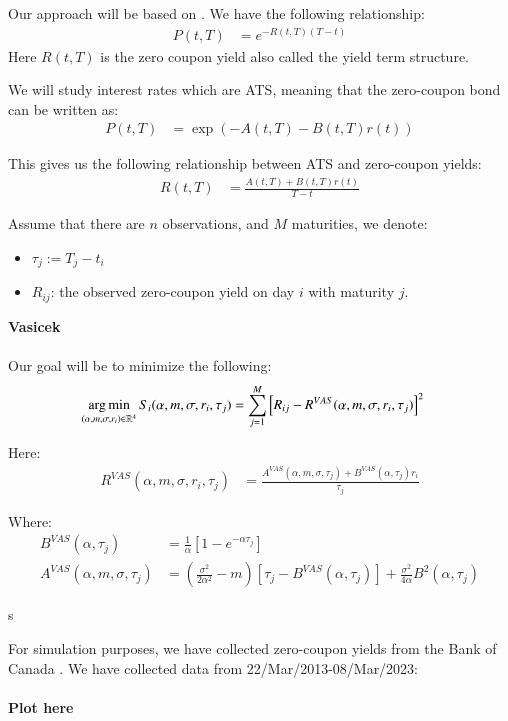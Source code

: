 \newpage 
Our approach will be based on \cite{halga2014}. We have the following relationship: 
\begin{align*}
P(t,T) &= e^{-R(t,T)(T-t)}
\end{align*}
Here $R(t,T)$ is the zero coupon yield also called the yield term structure. 


We will study interest rates which are ATS, meaning that the zero-coupon bond can be written as:
\begin{align*}
P(t,T) &= 
\exp\left(
-A(t,T) -B(t,T)r(t)
\right)
\end{align*}

This gives us the following relationship between ATS and zero-coupon yields: 
\begin{align*}
R(t,T) &= \frac{
A(t,T) + B(t,T)r(t)
}{
T-t
}    
\end{align*}

Assume that there are $n$ observations, and $M$ maturities, we denote: 
\begin{itemize}
    \item $\tau_{j} := T_{j} - t_{i}$
    \item $R_{ij}$: the observed zero-coupon yield on day $i$ with maturity $j$. 
\end{itemize}

\textbf{Vasicek}
\\~\\
Our goal will be to minimize the following: 
\begin{align*}
\operatorname*{arg\,min}\limits_{(\alpha, m, \sigma, r_{i}) \in \mathbb{R}^{4}}
S_{i}(\alpha, m, \sigma, r_{i}, \tau_{j}) 
&= 
\sum_{j=1}^{M}\left[
R_{ij} - R^{VAS}(\alpha, m, \sigma, r_{i}, \tau_{j})
\right]^{2}
\end{align*}

Here: 
\begin{align*}
R^{VAS}(\alpha, m, \sigma, r_{i}, \tau_{j})
&= 
\frac{
A^{VAS}(\alpha, m, \sigma, \tau_{j}) + B^{VAS}(\alpha, \tau_{j})r_{i}
}{
\tau_{j}
} 
\end{align*}

Where: 
\begin{align*}
B^{VAS}(\alpha, \tau_{j}) &= \frac{1}{\alpha}\left[
1 - e^{-\alpha \tau_{j}}
\right] \\ 
A^{VAS}(\alpha, m, \sigma, \tau_{j})
&= 
\left(
\frac{\sigma^{2}}{2\alpha^{2}} - m
\right)\left[
\tau_{j} - B^{VAS}(\alpha, \tau_{j})
\right]
+ \frac{\sigma^{2}}{4\alpha}B^{2}(\alpha, \tau_{j})
\end{align*}

\newpage 

s



\newpage 
For simulation purposes, we have collected zero-coupon yields from the Bank of Canada \cite{Canada_termyields}. We have collected data from 22/Mar/2013-08/Mar/2023: 
\\~\\ 
\textbf{Plot here}
\\~\\



